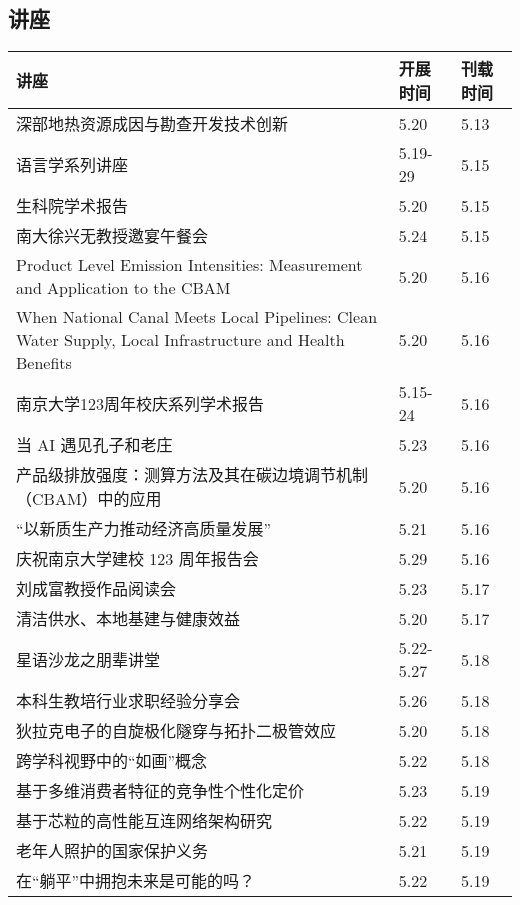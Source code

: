 \documentclass[letterpaper, 12pt]{article}
\begin{document}
\begin{multicols}{2}
\pagebreak

\section{讲座}
\begin{tabular}{|>{\centering\arraybackslash}m{}|m{}|m{}|}
    \hline
    讲座 & 开展时间 & 刊载时间\\
    \hline\hline
    深部地热资源成因与勘查开发技术创新 & 5.20 & 5.13\\\hline
    语言学系列讲座 & 5.19-29 & 5.15\\\hline
    生科院学术报告 & 5.20 & 5.15\\\hline
    南大徐兴无教授邀宴午餐会 & 5.24 & 5.15\\\hline
    Product  Level Emission Intensities: Measurement and Application to the CBAM & 5.20 & 5.16\\\hline
    When  National Canal Meets Local Pipelines: Clean Water Supply, Local Infrastructure  and Health Benefits & 5.20 & 5.16\\\hline
    南京大学123周年校庆系列学术报告 & 5.15-24 & 5.16\\\hline
    当 AI 遇见孔子和老庄 & 5.23 & 5.16\\\hline
    产品级排放强度：测算方法及其在碳边境调节机制（CBAM）中的应用 & 5.20 & 5.16\\\hline
    “以新质生产力推动经济高质量发展” & 5.21 & 5.16\\\hline
     庆祝南京大学建校 123 周年报告会 & 5.29 & 5.16\\\hline
     刘成富教授作品阅读会 & 5.23 & 5.17\\\hline
     清洁供水、本地基建与健康效益 & 5.20 & 5.17\\\hline
     星语沙龙之朋辈讲堂 & 5.22-5.27 & 5.18\\\hline
     本科生教培行业求职经验分享会 & 5.26 & 5.18\\\hline
     狄拉克电子的自旋极化隧穿与拓扑二极管效应 & 5.20 & 5.18\\\hline
     跨学科视野中的“如画”概念 & 5.22 & 5.18\\\hline
     基于多维消费者特征的竞争性个性化定价 & 5.23 & 5.19\\\hline
     基于芯粒的高性能互连网络架构研究 & 5.22 & 5.19\\\hline
     老年人照护的国家保护义务 & 5.21 & 5.19\\\hline
     在“躺平”中拥抱未来是可能的吗？ & 5.22 & 5.19\\\hline

\end{tabular}
\end{multicols}
\end{document}
